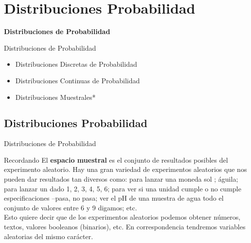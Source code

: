 \documentclass[11pt]{beamer}
\begin{document}
    \section*{Distribuciones Probabilidad}
      \begin{frame}{}
          \begin{center}
              \textbf{\huge Distribuciones de Probabilidad}
          \end{center}
      \end{frame}


      \begin{frame}{Distribuciones de Probabilidad}
          \begin{itemize}
              \item Distribuciones Discretas de Probabilidad
              \item Distribuciones Continuas de Probabilidad
              \item Distribuciones Muestrales*
          \end{itemize}
      \end{frame}

      \subsection*{Distribuciones Probabilidad}
        \begin{frame}{Distribuciones de Probabilidad}
            \begin{block}{Recordando}
              El \textbf{espacio muestral} es el conjunto de resultados posibles del experimento aleatorio. Hay una gran variedad de experimentos aleatorios que nos pueden dar resultados tan diversos como: para lanzar una moneda  {sol ; águila}; para lanzar un dado  {1, 2, 3, 4, 5, 6}; para ver si una unidad cumple o no cumple especificaciones –{pasa, no pasa}; ver el pH de una muestra de agua {todo el conjunto de valores entre 6 y 9 digamos}; etc. \\
              Esto quiere decir que de los experimentos aleatorios podemos obtener números, textos, valores booleanos (binarios), etc. En correspondencia tendremos variables aleatorias del mismo carácter.\\
            \end{block}
        \end{frame}
\end{document}

